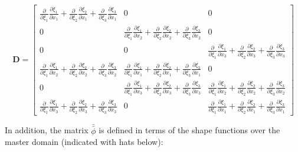 \documentclass[10pt]{article}
\begin{document}
\begin{equation}
\label{eq:D}
\textbf{D}=\begin{bmatrix}\frac{\partial}{\partial\xi_1}\frac{\partial\xi_1}{\partial x_1}+\frac{\partial}{\partial\xi_2}\frac{\partial\xi_2}{\partial x_1}+\frac{\partial}{\partial\xi_3}\frac{\partial\xi_3}{\partial x_1} & 0 & 0\\
0 & \frac{\partial}{\partial\xi_1}\frac{\partial\xi_1}{\partial x_2}+\frac{\partial}{\partial\xi_2}\frac{\partial\xi_2}{\partial x_2}+\frac{\partial}{\partial\xi_3}\frac{\partial\xi_3}{\partial x_2} & 0\\
0 & 0 & \frac{\partial}{\partial\xi_1}\frac{\partial\xi_1}{\partial x_3}+\frac{\partial}{\partial\xi_2}\frac{\partial\xi_2}{\partial x_3}+\frac{\partial}{\partial\xi_3}\frac{\partial\xi_3}{\partial x_3}\\
\frac{\partial}{\partial\xi_1}\frac{\partial\xi_1}{\partial x_2}+\frac{\partial}{\partial\xi_2}\frac{\partial\xi_2}{\partial x_2}+\frac{\partial}{\partial\xi_3}\frac{\partial\xi_3}{\partial x_2} & \frac{\partial}{\partial\xi_1}\frac{\partial\xi_1}{\partial x_1}+\frac{\partial}{\partial\xi_2}\frac{\partial\xi_2}{\partial x_1}+\frac{\partial}{\partial\xi_3}\frac{\partial\xi_3}{\partial x_1} & 0\\
0 & \frac{\partial}{\partial\xi_1}\frac{\partial\xi_1}{\partial x_3}+\frac{\partial}{\partial\xi_2}\frac{\partial\xi_2}{\partial x_3}+\frac{\partial}{\partial\xi_3}\frac{\partial\xi_3}{\partial x_3} & \frac{\partial}{\partial\xi_1}\frac{\partial\xi_1}{\partial x_2}+\frac{\partial}{\partial\xi_2}\frac{\partial\xi_2}{\partial x_2}+\frac{\partial}{\partial\xi_3}\frac{\partial\xi_3}{\partial x_2}\\
\frac{\partial}{\partial\xi_1}\frac{\partial\xi_1}{\partial x_3}+\frac{\partial}{\partial\xi_2}\frac{\partial\xi_2}{\partial x_3}+\frac{\partial}{\partial\xi_3}\frac{\partial\xi_3}{\partial x_3} & 0 & \frac{\partial}{\partial\xi_1}\frac{\partial\xi_1}{\partial x_1}+\frac{\partial}{\partial\xi_2}\frac{\partial\xi_2}{\partial x_1}+\frac{\partial}{\partial\xi_3}\frac{\partial\xi_3}{\partial x_1}\end{bmatrix}
\end{equation}

In addition, the matrix \(\bar{\bar{\phi}}\) is defined in terms of the shape functions over the master domain (indicated with hats below):
\end{document}
